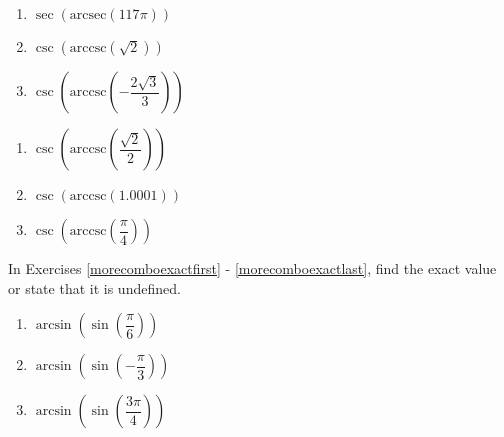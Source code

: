 \begin{multicols}{3}

\begin{enumerate}

\setcounter{enumi}{\value{HW}}

\item $\sec\left(\text{arcsec}\left( 117\pi \right)\right)$ 
\item $\csc\left(\text{arccsc}\left(\sqrt{2}\right)\right)$ 
\item $\csc\left(\text{arccsc}\left(-\dfrac{2\sqrt{3}}{3}\right)\right)$

\setcounter{HW}{\value{enumi}}

\end{enumerate}

\end{multicols}

\begin{multicols}{3}

\begin{enumerate}

\setcounter{enumi}{\value{HW}}

\item $\csc\left(\text{arccsc}\left(\dfrac{\sqrt{2}}{2}\right)\right)$
\item $\csc\left(\text{arccsc}\left(1.0001\right)\right)$ 
\item $\csc\left(\text{arccsc}\left( \dfrac{\pi}{4} \right)\right)$  \label{comboexactlast}

\setcounter{HW}{\value{enumi}}

\end{enumerate}

\end{multicols}

In Exercises \ref{morecomboexactfirst} - \ref{morecomboexactlast}, find the exact value or state that it is undefined.
\enlargethispage{.25in}

\begin{multicols}{3}

\begin{enumerate}

\setcounter{enumi}{\value{HW}}

\item  $\arcsin\left(\sin\left(\dfrac{\pi}{6}\right) \right)$   \label{morecomboexactfirst}
\item  $\arcsin\left(\sin\left(-\dfrac{\pi}{3}\right) \right)$  
\item  $\arcsin\left(\sin\left(\dfrac{3\pi}{4}\right) \right)$

\setcounter{HW}{\value{enumi}}

\end{enumerate}

\end{multicols}

